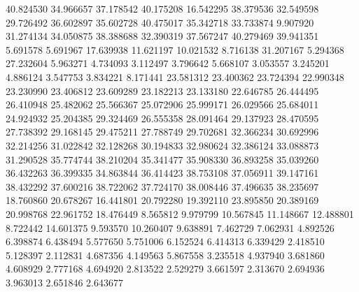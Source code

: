 40.824530
34.966657
37.178542
40.175208
16.542295
38.379536
32.549598
29.726492
36.602897
35.602728
40.475017
35.342718
33.733874
9.907920
31.274134
34.050875
38.388688
32.390319
37.567247
40.279469
39.941351
5.691578
5.691967
17.639938
11.621197
10.021532
8.716138
31.207167
5.294368
27.232604
5.963271
4.734093
3.112497
3.796642
5.668107
3.053557
3.245201
4.886124
3.547753
3.834221
8.171441
23.581312
23.400362
23.724394
22.990348
23.230990
23.406812
23.609289
23.182213
23.133180
22.646785
26.444495
26.410948
25.482062
25.566367
25.072906
25.999171
26.029566
25.684011
24.924932
25.204385
29.324469
26.555358
28.091464
29.137923
28.470595
27.738392
29.168145
29.475211
27.788749
29.702681
32.366234
30.692996
32.214256
31.022842
32.128268
30.194833
32.980624
32.386124
33.088873
31.290528
35.774744
38.210204
35.341477
35.908330
36.893258
35.039260
36.432263
36.399335
34.863844
36.414423
38.753108
37.056911
39.147161
38.432292
37.600216
38.722062
37.724170
38.008446
37.496635
38.235697
18.760860
20.678267
16.441801
20.792280
19.392110
23.895850
20.389169
20.998768
22.961752
18.476449
8.565812
9.979799
10.567845
11.148667
12.488801
8.722442
14.601375
9.593570
10.260407
9.638891
7.462729
7.062931
4.892526
6.398874
6.438494
5.577650
5.751006
6.152524
6.414313
6.339429
2.418510
5.128397
2.112831
4.687356
4.149563
5.867558
3.235518
4.937940
3.681860
4.608929
2.777168
4.694920
2.813522
2.529279
3.661597
2.313670
2.694936
3.963013
2.651846
2.643677
